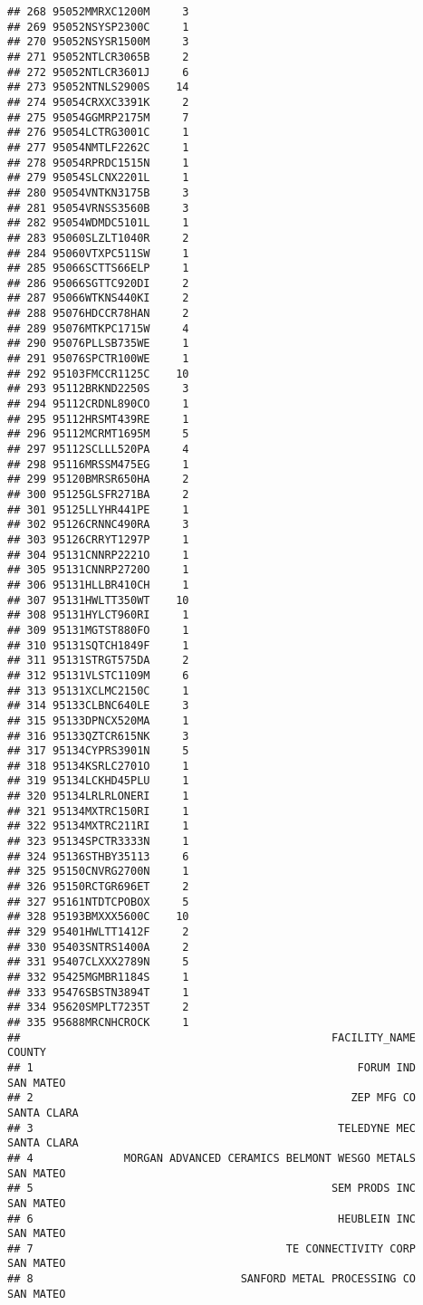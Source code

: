 \documentclass[
]{book}
\begin{document}
\begin{verbatim}
## 268 95052MMRXC1200M     3
## 269 95052NSYSP2300C     1
## 270 95052NSYSR1500M     3
## 271 95052NTLCR3065B     2
## 272 95052NTLCR3601J     6
## 273 95052NTNLS2900S    14
## 274 95054CRXXC3391K     2
## 275 95054GGMRP2175M     7
## 276 95054LCTRG3001C     1
## 277 95054NMTLF2262C     1
## 278 95054RPRDC1515N     1
## 279 95054SLCNX2201L     1
## 280 95054VNTKN3175B     3
## 281 95054VRNSS3560B     3
## 282 95054WDMDC5101L     1
## 283 95060SLZLT1040R     2
## 284 95060VTXPC511SW     1
## 285 95066SCTTS66ELP     1
## 286 95066SGTTC920DI     2
## 287 95066WTKNS440KI     2
## 288 95076HDCCR78HAN     2
## 289 95076MTKPC1715W     4
## 290 95076PLLSB735WE     1
## 291 95076SPCTR100WE     1
## 292 95103FMCCR1125C    10
## 293 95112BRKND2250S     3
## 294 95112CRDNL890CO     1
## 295 95112HRSMT439RE     1
## 296 95112MCRMT1695M     5
## 297 95112SCLLL520PA     4
## 298 95116MRSSM475EG     1
## 299 95120BMRSR650HA     2
## 300 95125GLSFR271BA     2
## 301 95125LLYHR441PE     1
## 302 95126CRNNC490RA     3
## 303 95126CRRYT1297P     1
## 304 95131CNNRP2221O     1
## 305 95131CNNRP2720O     1
## 306 95131HLLBR410CH     1
## 307 95131HWLTT350WT    10
## 308 95131HYLCT960RI     1
## 309 95131MGTST880FO     1
## 310 95131SQTCH1849F     1
## 311 95131STRGT575DA     2
## 312 95131VLSTC1109M     6
## 313 95131XCLMC2150C     1
## 314 95133CLBNC640LE     3
## 315 95133DPNCX520MA     1
## 316 95133QZTCR615NK     3
## 317 95134CYPRS3901N     5
## 318 95134KSRLC2701O     1
## 319 95134LCKHD45PLU     1
## 320 95134LRLRLONERI     1
## 321 95134MXTRC150RI     1
## 322 95134MXTRC211RI     1
## 323 95134SPCTR3333N     1
## 324 95136STHBY35113     6
## 325 95150CNVRG2700N     1
## 326 95150RCTGR696ET     2
## 327 95161NTDTCPOBOX     5
## 328 95193BMXXX5600C    10
## 329 95401HWLTT1412F     2
## 330 95403SNTRS1400A     2
## 331 95407CLXXX2789N     5
## 332 95425MGMBR1184S     1
## 333 95476SBSTN3894T     1
## 334 95620SMPLT7235T     2
## 335 95688MRCNHCROCK     1
##                                                FACILITY_NAME        COUNTY
## 1                                                  FORUM IND     SAN MATEO
## 2                                                 ZEP MFG CO   SANTA CLARA
## 3                                               TELEDYNE MEC   SANTA CLARA
## 4              MORGAN ADVANCED CERAMICS BELMONT WESGO METALS     SAN MATEO
## 5                                              SEM PRODS INC     SAN MATEO
## 6                                               HEUBLEIN INC     SAN MATEO
## 7                                       TE CONNECTIVITY CORP     SAN MATEO
## 8                                SANFORD METAL PROCESSING CO     SAN MATEO

\end{verbatim}
\end{document}
